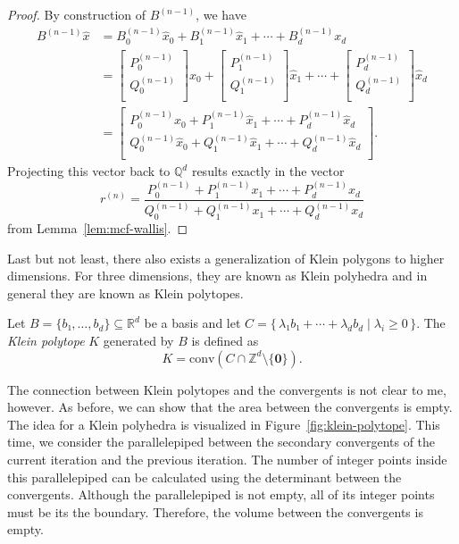 \begin{proof}
  By construction of $B^{(n-1)}$, we have
  \begin{align*}
    B^{(n-1)} \hat x
    & = B_0^{(n-1)} \hat x_0 + B_1^{(n-1)} \hat x_1 + ⋯ + B_d^{(n-1)} x_d \\
    & =
    \begin{bmatrix}
      P_0^{(n-1)} \\
      Q_0^{(n-1)} \\
    \end{bmatrix} \hat x_0
    + \begin{bmatrix}
      P_1^{(n-1)} \\
      Q_1^{(n-1)} \\
    \end{bmatrix} \hat x_1
    + ⋯ + \begin{bmatrix}
      P_d^{(n-1)} \\
      Q_d^{(n-1)} \\
    \end{bmatrix} \hat x_d \\
    & = \begin{bmatrix}
      P_0^{(n-1)} \hat x_0 + P_1^{(n-1)} \hat x_1 + ⋯ + P_d^{(n-1)} \hat x_d \\
      Q_0^{(n-1)} \hat x_0 + Q_1^{(n-1)} \hat x_1 + ⋯ + Q_d^{(n-1)} \hat x_d \\
    \end{bmatrix}.
  \end{align*}
  Projecting this vector back to $ℚ^d$ results exactly in the vector
  \[
    r^{(n)} = \frac{P_0^{(n-1)} + P_1^{(n-1)} x_1 + ⋯ + P_d^{(n-1)} x_d}{Q_0^{(n-1)} + Q_1^{(n-1)} x_1 + ⋯ + Q_d^{(n-1)} x_d}
  \]
  from
  Lemma~\ref{lem:mcf-wallis}.
\end{proof}

\iffalse
Last but not least,
there also exists a generalization of Klein polygons to higher dimensions.
For three dimensions, they are known as Klein polyhedra
and in general they are known as Klein polytopes.

\begin{definition}
  Let $B = \{b₁, …, b_d\} ⊆ ℝ^d$ be a basis and let $C = \{\, λ₁ b₁ + ⋯ + λ_d b_d \mid λ_i ≥ 0 \,\}$.
  The \emph{Klein polytope} $K$ generated by $B$ is defined as
  \[
    K = \mathrm{conv}(C ∩ ℤ^d \setminus \{\symbf 0\}).
  \]
\end{definition}

The connection between Klein polytopes and the convergents is not clear to me, however.
As before, we can show that the area between the convergents is empty.
The idea for a Klein polyhedra is visualized in Figure~\ref{fig:klein-polytope}.
This time, we consider the parallelepiped between the secondary convergents of the
current iteration and the previous iteration.
The number of integer points inside this parallelepiped can be calculated using
the determinant between the convergents.
Although the parallelepiped is not empty,
all of its integer points must be its the boundary.
Therefore, the volume between the convergents is empty.

